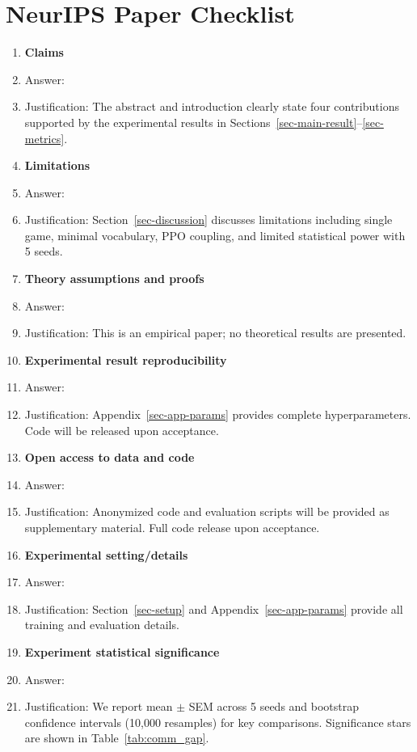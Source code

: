 \documentclass[
  10pt,
  letterpaper,
]{article}
\begin{document}
\newpage
\section*{NeurIPS Paper Checklist}

\begin{enumerate}

\item {\bf Claims}
    \item[] Answer: \answerYes{}
    \item[] Justification: The abstract and introduction clearly state four contributions supported by the experimental results in Sections~\ref{sec-main-result}--\ref{sec-metrics}.

\item {\bf Limitations}
    \item[] Answer: \answerYes{}
    \item[] Justification: Section~\ref{sec-discussion} discusses limitations including single game, minimal vocabulary, PPO coupling, and limited statistical power with 5 seeds.

\item {\bf Theory assumptions and proofs}
    \item[] Answer: \answerNA{}
    \item[] Justification: This is an empirical paper; no theoretical results are presented.

\item {\bf Experimental result reproducibility}
    \item[] Answer: \answerYes{}
    \item[] Justification: Appendix~\ref{sec-app-params} provides complete hyperparameters. Code will be released upon acceptance.

\item {\bf Open access to data and code}
    \item[] Answer: \answerYes{}
    \item[] Justification: Anonymized code and evaluation scripts will be provided as supplementary material. Full code release upon acceptance.

\item {\bf Experimental setting/details}
    \item[] Answer: \answerYes{}
    \item[] Justification: Section~\ref{sec-setup} and Appendix~\ref{sec-app-params} provide all training and evaluation details.

\item {\bf Experiment statistical significance}
    \item[] Answer: \answerYes{}
    \item[] Justification: We report mean $\pm$ SEM across 5 seeds and bootstrap confidence intervals (10,000 resamples) for key comparisons. Significance stars are shown in Table~\ref{tab:comm_gap}.


\end{enumerate}
\end{document}
